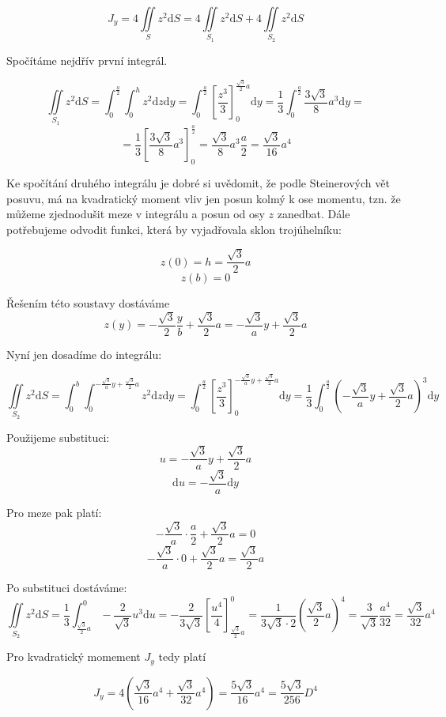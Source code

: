 \documentclass{article}
\begin{document}
\[ J_y=4\iint\limits_{S} z^2\mathrm{d}S = 4\iint\limits_{S_1} z^2\mathrm{d}S + 4\iint\limits_{S_2} z^2\mathrm{d}S\] 

Spočítáme nejdřív první integrál.

\[ \iint\limits_{S_1} z^2\mathrm{d}S = \int_{0}^{\frac{a}{2}} \int_{0}^{h} z^2 \mathrm{d}z \mathrm{d}y = 
\int_{0}^{\frac{a}{2}}\left[\frac{z^3}{3}\right]_0^{\frac{\sqrt{3}}{2}a} \mathrm{d}y = \frac{1}{3}\int_{0}^{\frac{a}{2}} \frac{3 \sqrt{3}}{8}a^3 \mathrm{d}y =\]
\[= \frac{1}{3} \left[ \frac{3 \sqrt{3}}{8}a^3 \right]_0^{\frac{a}{2}} = \frac{\sqrt{3}}{8}a^3 \frac{a}{2} = \frac{\sqrt{3}}{16}a^4\]

Ke spočítání druhého integrálu je dobré si uvědomit, že podle Steinerových vět posuvu, má na kvadratický moment vliv jen posun kolmý k ose momentu, 
tzn. že můžeme zjednodušit meze v integrálu a posun od osy $z$ zanedbat. Dále potřebujeme odvodit funkci, která by vyjadřovala sklon trojúhelníku:

\[ z(0)=h=\frac{\sqrt{3}}{2}a \] 
\[ z(b)=0 \]

Řešením této soustavy dostáváme
\[ z(y)=-\frac{\sqrt{3}}{2}\frac{y}{b}+\frac{\sqrt{3}}{2}a = -\frac{\sqrt{3}}{a}y+\frac{\sqrt{3}}{2}a\]

Nyní jen dosadíme do integrálu:

\[ \iint\limits_{S_2} z^2\mathrm{d}S = \int_{0}^{b}\int_{0}^{-\frac{\sqrt{3}}{a}y+\frac{\sqrt{3}}{2}a} z^2 \mathrm{d}z \mathrm{d}y = 
\int_{0}^{\frac{a}{2}} \left[ \frac{z^3}{3}\right]_0^{-\frac{\sqrt{3}}{a}y+\frac{\sqrt{3}}{2}a} \mathrm{d}y 
= \frac{1}{3} \int_{0}^{\frac{a}{2}} \left(-\frac{\sqrt{3}}{a}y+\frac{\sqrt{3}}{2}a\right)^3 \mathrm{d}y\]

Použijeme substituci:
\[ u = -\frac{\sqrt{3}}{a}y+\frac{\sqrt{3}}{2}a\]
\[ \mathrm{d}u = -\frac{\sqrt{3}}{a} \mathrm{d}y\]

Pro meze pak platí:
\[ -\frac{\sqrt{3}}{a} \cdot \frac{a}{2} + \frac{\sqrt{3}}{2}a = 0\]
\[ -\frac{\sqrt{3}}{a} \cdot 0 + \frac{\sqrt{3}}{2}a = \frac{\sqrt{3}}{2}a\]

Po substituci dostáváme:
\[ \iint\limits_{S_2} z^2\mathrm{d}S = \frac{1}{3} \int_{\frac{\sqrt{3}}{2}a}^{0} -\frac{2}{\sqrt{3}}u^3 \mathrm{d}u 
= -\frac{2}{3\sqrt{3}} \left[\frac{u^4}{4}\right]_{\frac{\sqrt{3}}{2}a}^{0} = \frac{1}{3\sqrt{3} \cdot 2}\left(\frac{\sqrt{3}}{2}a\right)^4=
\frac{3}{\sqrt{3}}\frac{a^4}{32} = \frac{\sqrt{3}}{32}a^4\]


Pro kvadratický momement $J_y$ tedy platí

\[ J_y= 4 \left( \frac{\sqrt{3}}{16}a^4 + \frac{\sqrt{3}}{32}a^4 \right) = \frac{5\sqrt{3}}{16}a^4 = \frac{5\sqrt{3}}{256}D^4\]
\end{document}
